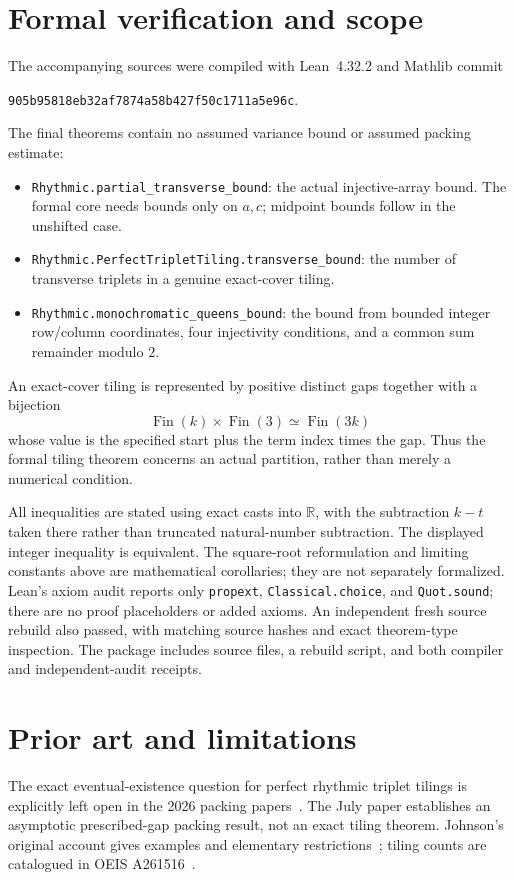 \documentclass[11pt]{article}
\newcommand{\R}{\mathbb R}
\begin{document}
\section{Formal verification and scope}
The accompanying sources were compiled with Lean~4.32.2 and Mathlib commit
\begin{center}\small\texttt{905b95818eb32af7874a58b427f50c1711a5e96c}.\end{center}
The final theorems contain no assumed variance bound or assumed packing estimate:
\begin{itemize}[leftmargin=1.5em,itemsep=3pt]
\item \texttt{Rhythmic.partial\_transverse\_bound}: the actual injective-array bound. The formal core needs bounds only on $a,c$; midpoint bounds follow in the unshifted case.
\item \texttt{Rhythmic.PerfectTripletTiling.transverse\_bound}: the number of transverse triplets in a genuine exact-cover tiling.
\item \texttt{Rhythmic.monochromatic\_queens\_bound}: the bound from bounded integer row/column coordinates, four injectivity conditions, and a common sum remainder modulo $2$.
\end{itemize}
An exact-cover tiling is represented by positive distinct gaps together with a bijection
\[
\operatorname{Fin}(k)\times\operatorname{Fin}(3)\simeq\operatorname{Fin}(3k)
\]
whose value is the specified start plus the term index times the gap. Thus the formal tiling theorem concerns an actual partition, rather than merely a numerical condition.

All inequalities are stated using exact casts into $\R$, with the subtraction $k-t$ taken there rather than truncated natural-number subtraction. The displayed integer inequality is equivalent. The square-root reformulation and limiting constants above are mathematical corollaries; they are not separately formalized. Lean's axiom audit reports only \texttt{propext}, \texttt{Classical.choice}, and \texttt{Quot.sound}; there are no proof placeholders or added axioms. An independent fresh source rebuild also passed, with matching source hashes and exact theorem-type inspection. The package includes source files, a rebuild script, and both compiler and independent-audit receipts.

\section{Prior art and limitations}
The exact eventual-existence question for perfect rhythmic triplet tilings is explicitly left open in the 2026 packing papers~\cite{alon,mao}. The July paper establishes an asymptotic prescribed-gap packing result, not an exact tiling theorem. Johnson's original account gives examples and elementary restrictions~\cite{johnson}; tiling counts are catalogued in OEIS A261516~\cite{tilingoeis}.
\end{document}
